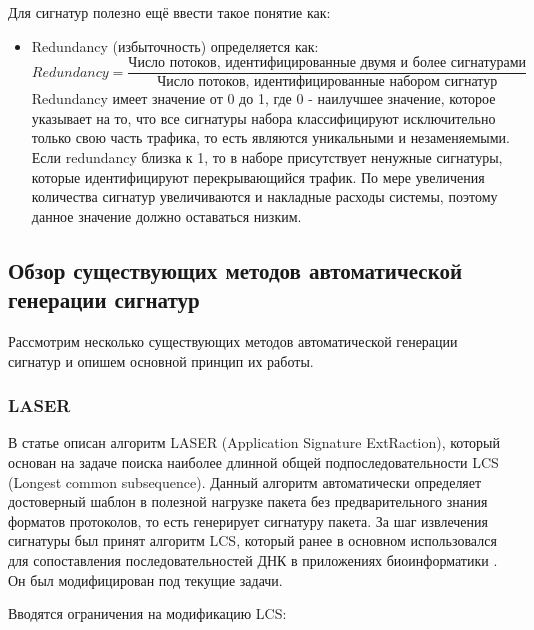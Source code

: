 Для сигнатур полезно ещё ввести такое понятие как:

\begin{itemize}
    \item Redundancy (избыточность) определяется как:
    $$ \textit{Redundancy} = \frac{\text{Число потоков, идентифицированные двумя и более сигнатурами}}{\text{Число потоков, идентифицированные набором сигнатур}}$$
    Redundancy имеет значение от 0 до 1, где 0 - наилучшее значение, которое указывает на то, что все сигнатуры набора классифицируют исключительно только свою часть трафика,
    то есть являются уникальными и незаменяемыми. Если redundancy близка к 1, то в наборе присутствует ненужные сигнатуры, которые идентифицируют перекрывающийся трафик.
    По мере увеличения количества сигнатур увеличиваются и накладные расходы системы, поэтому данное значение должно оставаться низким.
\end{itemize}

\subsection{Обзор существующих методов автоматической генерации сигнатур}

Рассмотрим несколько существующих методов автоматической генерации сигнатур и опишем основной принцип их работы.

\subsubsection{LASER}

В статье \cite{park2008towards} описан алгоритм LASER (Application Signature ExtRaction),
который основан на задаче поиска наиболее длинной общей подпоследовательности LCS (Longest common subsequence).
Данный алгоритм автоматически определяет достоверный шаблон в полезной нагрузке пакета без предварительного знания форматов протоколов, то есть генерирует сигнатуру пакета.
За шаг извлечения сигнатуры был принят алгоритм LCS, который ранее в основном использовался для сопоставления последовательностей ДНК в приложениях биоинформатики \cite{ning2006finding}.
Он был модифицирован под текущие задачи.

Вводятся ограничения на модификацию LCS:

